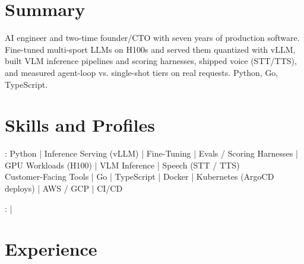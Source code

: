 \documentclass[print]{jack-resume}
\begin{document}
\pagecolor{darkmodeBackground}


\begin{minipage}[t][1cm][t]{.03\textwidth}
    \hfill
\end{minipage}

\section{Summary}
AI engineer and two-time founder/CTO with seven years of production software. Fine-tuned multi-sport LLMs on H100s and served them quantized with vLLM, built VLM inference pipelines and scoring harnesses, shipped voice (STT/TTS), and measured agent-loop vs. single-shot tiers on real requests. Python, Go, TypeScript.
\sectionsep

\section{Skills and Profiles}
:
Python \hfill | \hfill
Inference Serving (vLLM) \hfill | \hfill
Fine-Tuning \hfill | \hfill
Evals / Scoring Harnesses \hfill | \hfill
GPU Workloads (H100) \hfill | \hfill
VLM Inference \hfill | \hfill
Speech (STT / TTS) \\
\hspace{1.0cm} Customer-Facing Tools \hfill | \hfill
Go \hfill | \hfill
TypeScript \hfill | \hfill
Docker \hfill | \hfill
Kubernetes (ArgoCD deploys) \hfill | \hfill
AWS / GCP \hfill | \hfill
CI/CD \\

\raggedright{
    :
      \href{https://www.linkedin.com/in/jack-sturtevant/}{ \ExternalLink} |
     \href{https://github.com/jacksturt}{ \ExternalLink}}

\section{Experience}
\end{document}
